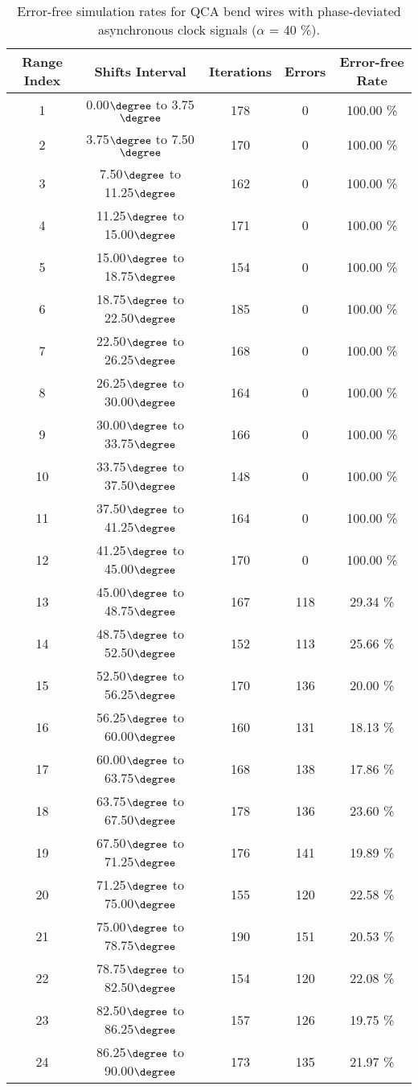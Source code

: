 \flushleft
\begin{table}[h]
\begin{center}
\caption{Error-free simulation rates for QCA bend wires with phase-deviated asynchronous clock signals ($\alpha$ = 40 \%).}
\begin{tabular}{|c|c|c|c|c|}
\hline
\textbf{Range Index} & \textbf{Shifts Interval} & \textbf{Iterations} & \textbf{Errors} & \textbf{Error-free Rate} \\
\hline
1  &  0.00$\degree$ to  3.75$\degree$ & 178 &  0 & 100.00 \% \\
\hline
2  &  3.75$\degree$ to  7.50$\degree$ & 170 &  0 & 100.00 \% \\
\hline
3  &  7.50$\degree$ to 11.25$\degree$ & 162 &  0 & 100.00 \% \\
\hline
4  & 11.25$\degree$ to 15.00$\degree$ & 171 &  0 & 100.00 \% \\
\hline
5  & 15.00$\degree$ to 18.75$\degree$ & 154 &  0 & 100.00 \% \\
\hline
6  & 18.75$\degree$ to 22.50$\degree$ & 185 &  0 & 100.00 \% \\
\hline
7  & 22.50$\degree$ to 26.25$\degree$ & 168 &  0 & 100.00 \% \\
\hline
8  & 26.25$\degree$ to 30.00$\degree$ & 164 &  0 & 100.00 \% \\
\hline
9  & 30.00$\degree$ to 33.75$\degree$ & 166 &  0 & 100.00 \% \\
\hline
10 & 33.75$\degree$ to 37.50$\degree$ & 148 &  0 & 100.00 \% \\
\hline
11 & 37.50$\degree$ to 41.25$\degree$ & 164 &  0 & 100.00 \% \\
\hline
12 & 41.25$\degree$ to 45.00$\degree$ & 170 &  0 & 100.00 \% \\
\hline
13 & 45.00$\degree$ to 48.75$\degree$ & 167 & 118 &  29.34 \% \\
\hline
14 & 48.75$\degree$ to 52.50$\degree$ & 152 & 113 &  25.66 \% \\
\hline
15 & 52.50$\degree$ to 56.25$\degree$ & 170 & 136 &  20.00 \% \\
\hline
16 & 56.25$\degree$ to 60.00$\degree$ & 160 & 131 &  18.13 \% \\
\hline
17 & 60.00$\degree$ to 63.75$\degree$ & 168 & 138 &  17.86 \% \\
\hline
18 & 63.75$\degree$ to 67.50$\degree$ & 178 & 136 &  23.60 \% \\
\hline
19 & 67.50$\degree$ to 71.25$\degree$ & 176 & 141 &  19.89 \% \\
\hline
20 & 71.25$\degree$ to 75.00$\degree$ & 155 & 120 &  22.58 \% \\
\hline
21 & 75.00$\degree$ to 78.75$\degree$ & 190 & 151 &  20.53 \% \\
\hline
22 & 78.75$\degree$ to 82.50$\degree$ & 154 & 120 &  22.08 \% \\
\hline
23 & 82.50$\degree$ to 86.25$\degree$ & 157 & 126 &  19.75 \% \\
\hline
24 & 86.25$\degree$ to 90.00$\degree$ & 173 & 135 &  21.97 \% \\
\hline


\end{tabular}
\end{center}
\end{table}
